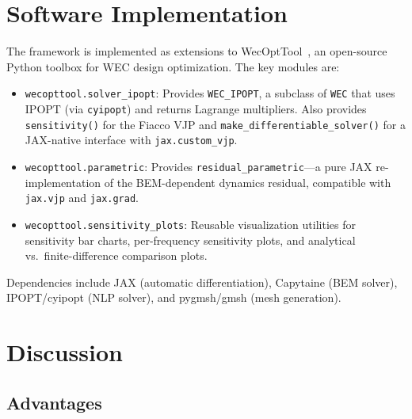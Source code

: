 \documentclass[11pt,a4paper]{article}
\begin{document}
\section{Software Implementation}
\label{sec:software}

The framework is implemented as extensions to
WecOptTool~\citep{wecopttool}, an open-source Python toolbox for
WEC design optimization.  The key modules are:

\begin{itemize}
    \item \texttt{wecopttool.solver\_ipopt}: Provides
          \texttt{WEC\_IPOPT}, a subclass of \texttt{WEC} that uses
          IPOPT (via \texttt{cyipopt}) and returns Lagrange
          multipliers.  Also provides \texttt{sensitivity()} for
          the Fiacco VJP and
          \texttt{make\_differentiable\_solver()} for a JAX-native
          interface with \texttt{jax.custom\_vjp}.
    \item \texttt{wecopttool.parametric}: Provides
          \texttt{residual\_parametric}---a pure JAX re-implementation
          of the BEM-dependent dynamics residual, compatible with
          \texttt{jax.vjp} and \texttt{jax.grad}.
    \item \texttt{wecopttool.sensitivity\_plots}: Reusable
          visualization utilities for sensitivity bar charts,
          per-frequency sensitivity plots, and analytical vs.\
          finite-difference comparison plots.
\end{itemize}

Dependencies include JAX (automatic differentiation), Capytaine
(BEM solver), IPOPT/cyipopt (NLP solver), and pygmsh/gmsh
(mesh generation).


\section{Discussion}
\label{sec:discussion}

\subsection{Advantages}
\end{document}
